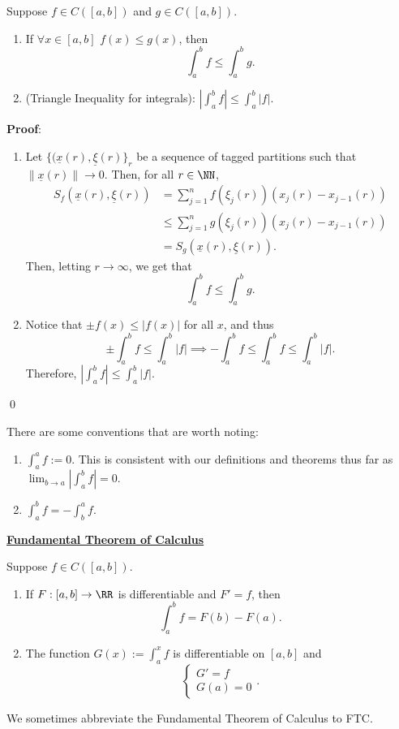 \begin{theorem}
Suppose $f\in C([a,b])$ and $g\in C([a,b])$. 
\begin{enumerate}
    \item If $\forall x\in [a,b]$ $f(x) \leq g(x)$, then
    \[
    \int_a^b f \leq \int_a^b g.
    \]
    \item (Triangle Inequality for integrals): $|\int_a^b f| \leq \int_a^b |f|$.
\end{enumerate}
\end{theorem}
\textbf{Proof}:
\begin{enumerate}
    \item Let $\{(\underline{x}(r), \underline{\xi}(r)\}_r$ be a sequence of tagged partitions such that $\lVert \underline{x}(r)\rVert\to 0$. Then, for all $r\in \NN$,
    \begin{align*}
    S_f(\underline{x}(r), \underline{\xi}(r)) &= \sum_{j=1}^n f(\xi_j(r))(x_j(r)-x_{j-1}(r)) \\
    &\leq \sum_{j=1}^n g(\xi_j(r))(x_j(r)-x_{j-1}(r)) \\
    &= S_g(\underline{x}(r), \underline{\xi}(r)).
    \end{align*}
    Then, letting $r\to \infty$, we get that 
    \[
    \int_a^b f \leq \int_a^b g.
    \]
    \item Notice that $\pm f(x) \leq |f(x)|$ for all $x$, and thus 
    \[
    \pm\int_a^b f \leq \int_a^b |f| \implies -\int_a^b f \leq \int_a^b f \leq \int_a^b |f|.
    \]
    Therefore, $|\int_a^b f|\leq \int_a^b |f|$.
\end{enumerate}
\qed 

\begin{remark}
There are some conventions that are worth noting:
\begin{enumerate}
    \item $\int_a^a f := 0$. This is consistent with our definitions and theorems thus far as $\lim_{b\to a}|\int_a^b f| = 0$. \item $\int_a^b f = -\int_b^a f.$
\end{enumerate}
\end{remark}

\noindent\underline{\textbf{Fundamental Theorem of Calculus}}

\begin{theorem}
Suppose $f\in C([a,b])$.
\begin{enumerate}
    \item If $F:[a,b] \to \RR$ is differentiable and $F' = f$, then 
\[
\int_a^b f = F(b) - F(a).
\]
    \item The function $G(x):= \int_a^x f$ is differentiable on $[a,b]$ and 
    \[
    \begin{cases}
    G' = f \\
    G(a) = 0
    \end{cases}.
    \]
\end{enumerate}
\end{theorem}
\begin{remark}
We sometimes abbreviate the Fundamental Theorem of Calculus to FTC.
\end{remark}

